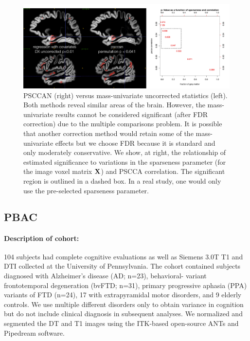 \documentclass{llncs}
\newcommand{\X}{{\bf X}}
\begin{document}
\begin{figure}
\begin{center}
\includegraphics[width=120mm]{figs/MUvPSCCAN.pdf} 
\end{center}
\vspace{-0.1in}
\caption{PSCCAN (right) versus mass-univariate uncorrected statistics
(left).  Both methods reveal similar areas of the brain.  However, the
mass-univariate results cannot be considered significant (after FDR
correction) due to the multiple comparisons problem.  It is possible
that another correction method would retain some of the mass-univariate
effects but we choose FDR because it is standard and only moderately
conservative.  We show, at right, the relationship of estimated
significance to variations in the sparseness parameter (for the image
voxel matrix $\X$) and PSCCA correlation.  The significant region is
outlined in a dashed box.  In a real study, one would only use the
pre-selected sparseness parameter.}
\label{fig:comp}
\end{figure}
\subsection{PBAC}
\paragraph{Description of cohort: }
104 subjects had complete cognitive evaluations as well as Siemens
3.0T T1 and DTI collected at the University of Pennsylvania. The
cohort contained subjects diagnosed with Alzheimer's disease (AD;
n=23), behavioral- variant frontotemporal degeneration (bvFTD; n=31),
primary progressive aphasia (PPA) variants of FTD (n=24), 17 with
extrapyramidal motor disorders, and 9 elderly controls. We use
multiple different disorders only to obtain variance in cognition but
do not include clinical diagnosis in subsequent analyses. We
normalized and segmented \cite{Avants2011a} the DT and T1 images using
the ITK-based open-source ANTs \cite{Avants2011} and Pipedream software.
\end{document}
